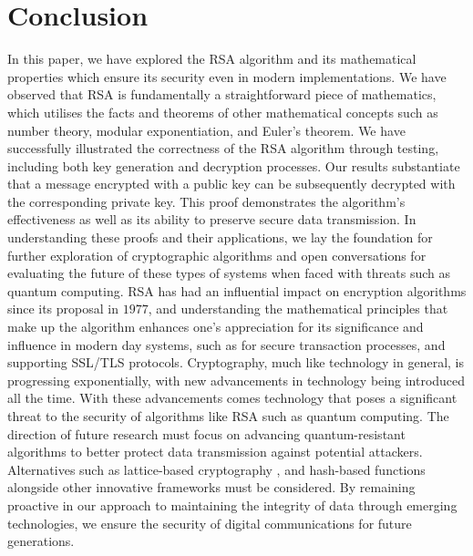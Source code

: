 \documentclass{article}
\begin{document}
\section{Conclusion}
In this paper, we have explored the RSA algorithm and its mathematical properties which ensure its security even in modern implementations. We have observed that RSA is fundamentally a straightforward piece of mathematics, which utilises the facts and theorems of other mathematical concepts such as number theory, modular exponentiation, and Euler's theorem. We have successfully illustrated the correctness of the RSA algorithm through testing, including both key generation and decryption processes. Our results substantiate that a message encrypted with a public key can be subsequently decrypted with the corresponding private key. This proof demonstrates the algorithm's effectiveness as well as its ability to preserve secure data transmission. In understanding these proofs and their applications, we lay the foundation for further exploration of cryptographic algorithms and open conversations for evaluating the future of these types of systems when faced with threats such as quantum computing. RSA has had an influential impact on encryption algorithms since its proposal in $1977$, and understanding the mathematical principles that make up the algorithm enhances one's appreciation for its significance and influence in modern day systems, such as for secure transaction processes, and supporting SSL/TLS protocols. Cryptography, much like technology in general, is progressing exponentially, with new advancements in technology being introduced all the time. With these advancements comes technology that poses a significant threat to the security of algorithms like RSA such as quantum computing. The direction of future research must focus on advancing quantum-resistant algorithms to better protect data transmission against potential attackers. Alternatives such as lattice-based cryptography \cite{lattice}, and hash-based functions alongside other innovative frameworks must be considered. By remaining proactive in our approach to maintaining the integrity of data through emerging technologies, we ensure the security of digital communications for future generations. 
\end{document}
